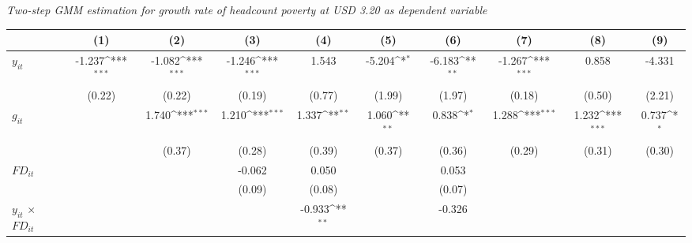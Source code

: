 \documentclass[12pt, a4paper]{article}
\begin{document}
\begin{table}[htbp]
\begin{threeparttable}
\begin{tablenotes}
		\end{tablenotes}
	\end{threeparttable}
	\caption[Two-Step System-GMM Estimation Results for Headcount Poverty at USD 3.20]{\textit{Two-step GMM estimation for growth rate of headcount poverty at USD 3.20 as dependent variable}}
	\label{2GMM320full}
\end{table}

	\begin{table}[htbp]
	\centering
	\scriptsize
	\setlength\tabcolsep{1pt}	
	\begin{threeparttable}
		{
			\def\sym#1{\ifmmode^{#1}\else\(^{#1}\)\fi}
			\begin{tabular}{l*{9}{c}}
				\hline\hline
				&\multicolumn{1}{c}{(1)}&\multicolumn{1}{c}{(2)}&\multicolumn{1}{c}{(3)}&\multicolumn{1}{c}{(4)}&\multicolumn{1}{c}{(5)}&\multicolumn{1}{c}{(6)}&\multicolumn{1}{c}{(7)}&\multicolumn{1}{c}{(8)}&\multicolumn{1}{c}{(9)}\\
				\hline
				$y_{it}$               &      -1.237\sym{***}&      -1.082\sym{***}&      -1.246\sym{***}&       1.543         &      -5.204\sym{*}  &      -6.183\sym{**} &      -1.267\sym{***}&       0.858         &      -4.331         \\
				&      (0.22)         &      (0.22)         &      (0.19)         &      (0.77)         &      (1.99)         &      (1.97)         &      (0.18)         &      (0.50)         &      (2.21)         \\
				$g_{it}$             &                     &       1.740\sym{***}&       1.210\sym{***}&       1.337\sym{**} &       1.060\sym{**} &       0.838\sym{*}  &       1.288\sym{***}&       1.232\sym{***}&       0.737\sym{*}  \\
				&                     &      (0.37)         &      (0.28)         &      (0.39)         &      (0.37)         &      (0.36)         &      (0.29)         &      (0.31)         &      (0.30)         \\
				$FD_{it}$                &                     &                     &      -0.062         &       0.050         &                     &       0.053         &                     &                     &                     \\
				&                     &                     &      (0.09)         &      (0.08)         &                     &      (0.07)         &                     &                     &                     \\
				$y_{it}$ $\times$ $FD_{it}$ &                     &                     &                     &      -0.933\sym{**} &                     &      -0.326         &                     &                     &                     \\

\end{tabular}}
\end{threeparttable}
\end{table}
\end{document}
